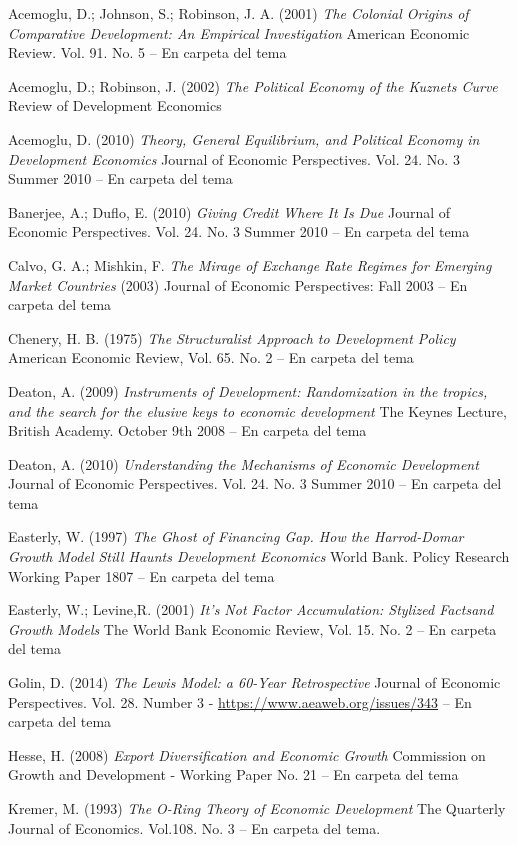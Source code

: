 \documentclass{nuevotema}
\begin{document}
Acemoglu, D.; Johnson, S.; Robinson, J. A. (2001) \textit{The Colonial Origins of Comparative Development: An Empirical Investigation} American Economic Review. Vol. 91. No. 5 -- En carpeta del tema

Acemoglu, D.; Robinson, J. (2002) \textit{The Political Economy of the Kuznets Curve} Review of Development Economics

Acemoglu, D. (2010) \textit{Theory, General Equilibrium, and Political Economy in Development Economics} Journal of Economic Perspectives. Vol. 24. No. 3 Summer 2010 -- En carpeta del tema

Banerjee, A.; Duflo, E. (2010) \textit{Giving Credit Where It Is Due} Journal of Economic Perspectives. Vol. 24. No. 3 Summer 2010 -- En carpeta del tema

Calvo, G. A.; Mishkin, F. \textit{The Mirage of Exchange Rate Regimes for Emerging Market Countries} (2003) Journal of Economic Perspectives: Fall 2003 -- En carpeta del tema

Chenery, H. B. (1975) \textit{The Structuralist Approach to Development Policy} American Economic Review, Vol. 65. No. 2 -- En carpeta del tema

Deaton, A. (2009) \textit{Instruments of Development: Randomization in the tropics, and the search for the elusive keys to economic development} The Keynes Lecture, British Academy. October 9th 2008 -- En carpeta del tema

Deaton, A. (2010) \textit{Understanding the Mechanisms of Economic Development} Journal of Economic Perspectives. Vol. 24. No. 3 Summer 2010 -- En carpeta del tema

Easterly, W. (1997) \textit{The Ghost of Financing Gap. How the Harrod-Domar Growth Model Still Haunts Development Economics} World Bank. Policy Research Working Paper 1807 -- En carpeta del tema

Easterly, W.; Levine,R. (2001) \textit{It's Not Factor Accumulation: Stylized Factsand Growth Models} The World Bank Economic Review, Vol. 15. No. 2 -- En carpeta del tema

Golin, D. (2014) \textit{The Lewis Model: a 60-Year Retrospective} Journal of Economic Perspectives. Vol. 28. Number 3 - \url{https://www.aeaweb.org/issues/343} -- En carpeta del tema

Hesse, H. (2008) \textit{Export Diversification and Economic Growth} Commission on Growth and Development - Working Paper No. 21 -- En carpeta del tema

Kremer, M. (1993) \textit{The O-Ring Theory of Economic Development} The Quarterly Journal of Economics. Vol.108. No. 3 -- En carpeta del tema.
\end{document}
